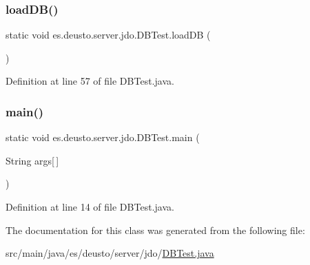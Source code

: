 \mbox{\label{classes_1_1deusto_1_1server_1_1jdo_1_1_d_b_test_a8430b487bdfdf20d5f0e26517b7de1cc}} 
\subsubsection{\texorpdfstring{load\+D\+B()}{loadDB()}}
{\footnotesize\ttfamily static void es.\+deusto.\+server.\+jdo.\+D\+B\+Test.\+load\+DB (\begin{DoxyParamCaption}{ }\end{DoxyParamCaption})\hspace{0.3cm}{\ttfamily [static]}}



Definition at line 57 of file D\+B\+Test.\+java.

\mbox{\label{classes_1_1deusto_1_1server_1_1jdo_1_1_d_b_test_afd0180d9045ac006d8cbd145b9935c65}} 
\subsubsection{\texorpdfstring{main()}{main()}}
{\footnotesize\ttfamily static void es.\+deusto.\+server.\+jdo.\+D\+B\+Test.\+main (\begin{DoxyParamCaption}\item[{String}]{args\mbox{[}$\,$\mbox{]} }\end{DoxyParamCaption})\hspace{0.3cm}{\ttfamily [static]}}



Definition at line 14 of file D\+B\+Test.\+java.



The documentation for this class was generated from the following file\+:\begin{DoxyCompactItemize}
\item 
src/main/java/es/deusto/server/jdo/\hyperlink{_d_b_test_8java}{D\+B\+Test.\+java}\end{DoxyCompactItemize}
